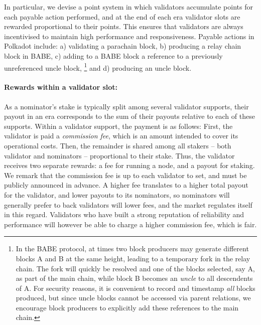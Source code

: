 In particular, we devise a point system in which validators accumulate points for each payable action performed, 
and at the end of each era validator slots are rewarded proportional to their points. 
This ensures that validators are always incentivised to maintain high performance and responsiveness. 
Payable actions in Polkadot include: a) validating a parachain block, 
b) producing a relay chain block in BABE, 
c) adding to a BABE block a reference to a previously unreferenced uncle block,%
\footnote{In the BABE protocol, at times two block producers may generate different blocks A and B at the same height, leading to a temporary fork in the relay chain. The fork will quickly be resolved and one of the blocks selected, say A, as part of the main chain, while block B becomes an \emph{uncle} to all descendents of A. For security reasons, it is convenient to record and timestamp \emph{all} blocks produced, but since uncle blocks cannot be accessed via parent relations, we encourage block producers to explicitly add these references to the main chain.}
 and d) producing an uncle block.

\paragraph{Rewards within a validator slot:} As a nominator's stake is typically split among several validator supports, 
their payout in an era corresponds to the sum of their payouts relative to each of these supports. 
Within a validator support, the payment is as follows: 
First, the validator is paid a \emph{commission fee}, which is an amount intended to cover its operational costs. 
Then, the remainder is shared among all stakers -- both validator and nominators -- proportional to their stake. 
Thus, the validator receives two separate rewards: a fee for running a node, and a payout for staking. 
We remark that the commission fee is up to each validator to set, and must be publicly announced in advance. 
A higher fee translates to a higher total payout for the validator, and lower payouts to its nominators, 
so nominators will generally prefer to back validators will lower fees, and the market regulates itself in this regard. 
Validators who have built a strong reputation of reliability and performance 
will however be able to charge a higher commission fee, which is fair.

\medskip

